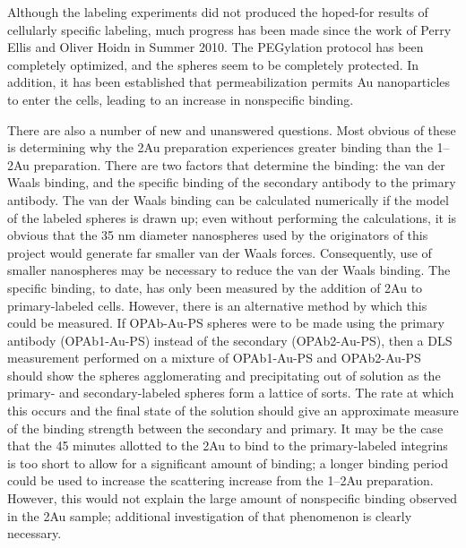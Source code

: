 Although the labeling experiments did not produced the hoped-for results of cellularly specific labeling, much progress has been made since the work of Perry Ellis and Oliver Hoidn in Summer 2010. The PEGylation protocol has been completely optimized, and the spheres seem to be completely protected. In addition, it has been established that permeabilization permits Au nanoparticles to enter the cells, leading to an increase in nonspecific binding.

There are also a number of new and unanswered questions. Most obvious of these is determining why the 2Au preparation experiences greater binding than the 1--2Au preparation. There are two factors that determine the binding: the van der Waals binding, and the specific binding of the secondary antibody to the primary antibody. The van der Waals binding can be calculated numerically if the model of the labeled spheres is drawn up; even without performing the calculations, it is obvious that the 35 nm diameter nanospheres used by the originators of this project would generate far smaller van der Waals forces. Consequently, use of smaller nanospheres may be necessary to reduce the van der Waals binding. The specific binding, to date, has only been measured by the addition of 2Au to primary-labeled cells. However, there is an alternative method by which this could be measured. If OPAb-Au-PS spheres were to be made using the primary antibody (OPAb1-Au-PS) instead of the secondary (OPAb2-Au-PS), then a DLS measurement performed on a mixture of OPAb1-Au-PS and OPAb2-Au-PS should show the spheres agglomerating and precipitating out of solution as the primary- and secondary-labeled spheres form a lattice of sorts. The rate at which this occurs and the final state of the solution should give an approximate measure of the binding strength between the secondary and primary. It may be the case that the 45 minutes allotted to the 2Au to bind to the primary-labeled integrins is too short to allow for a significant amount of binding; a longer binding period could be used to increase the scattering increase from the 1--2Au preparation. However, this would not explain the large amount of nonspecific binding observed in the 2Au sample; additional investigation of that phenomenon is clearly necessary.
